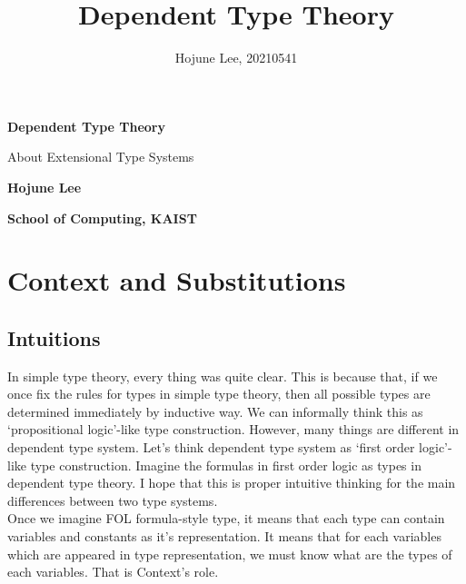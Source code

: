 \documentclass[12pt, a4paper, openany, twoside]{book}
\author{Hojune Lee, 20210541}
\title{Dependent Type Theory}
\theoremstyle{definition}
\theoremstyle{remark}
\theoremstyle{plain}
\numberwithin{equation}{section}
\begin{document}
\begin{titlepage}
    \begin{center}
        \vspace*{9cm}
            
        \Huge
        \textbf{Dependent Type Theory}
    
        \vspace{1cm}
        \large
        About Extensional Type Systems
        \vspace{3cm}
        
        \LARGE
        \textbf{Hojune Lee}
            
        \vspace{8cm}
            
        \normalsize
        \textbf{School of Computing, KAIST}\\  
    \end{center}
\end{titlepage}

\hypersetup{linkcolor=black}
\tableofcontents
\hypersetup{linkcolor=blue}

\newpage 

\chapter{Context and Substitutions}

\section{Intuitions}

In simple type theory, every thing was quite clear. This is because that, if we once fix the rules for types in simple type theory, 
then all possible types are determined immediately by inductive way. We can informally think this as \lq propositional logic'-like type construction. 
However, many things are different in dependent type system. Let's think dependent type system as \lq first order logic'-like type construction. 
Imagine the formulas in first order logic as types in dependent type theory. 
I hope that this is proper intuitive thinking for the main differences between two type systems. \\

Once we imagine FOL formula-style type, it means that each type can contain variables and constants as it's representation. 
It means that for each variables which are appeared in type representation, we must know what are the types of each variables.
That is Context's role. \\
\end{document}
